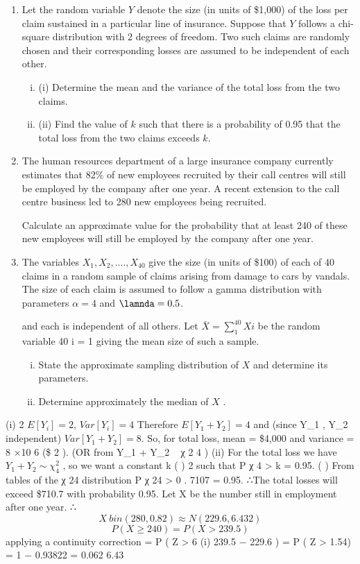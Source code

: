 \documentclass[a4paper,12pt]{article}
\begin{document}
\begin{enumerate}
\item 
Let the random variable $Y$ denote the size (in units of \$1,000) of the loss per claim sustained in a particular line of insurance. Suppose that $Y$ follows a chi-square distribution with 2 degrees of freedom. Two such claims are randomly chosen and
their corresponding losses are assumed to be independent of each other.
\begin{enumerate}[(i)]
\item (i) Determine the mean and the variance of the total loss from the two claims. 
\item (ii) Find the value of $k$ such that there is a probability of 0.95 that the total loss from the two claims exceeds $k$.
\end{enumerate}
\item 
The human resources department of a large insurance company currently estimates that 82\% of new employees recruited by their call centres will still be employed by the company after one year. A recent extension to the call centre business led to 280
new employees being recruited.

Calculate an approximate value for the probability that at least 240 of these new employees will still be employed by the company after one year.
\item The variables $X_1 , X_2 , .\ldots, X_{40}$ give the size (in units of \$100) of each of 40 claims in a random sample of claims arising from damage to cars by vandals. The size of each claim is assumed to follow a gamma distribution with parameters $\alpha = 4$ and $\lamnda = 0.5$.

and each is independent of all others. Let $\bar{X} =
\sum^{40}_{1} X i$ be the random variable
40 i = 1
giving the mean size of such a sample.
\begin{enumerate}[(i)]
\item 
State the approximate sampling distribution of $X$ and determine its parameters.
\item 
Determine approximately the median of $X$ .
\end{enumerate}
\end{enumerate}
(i)
2
$E [ Y_i ] = 2$, $Var [ Y_i ] = 4$
Therefore $E [ Y_1 + Y_2 ] = 4$ and (since Y_1 , Y_2 independent) $Var [ Y_1 + Y_2 ] = 8$.
So, for total loss, mean = \$4,000 and variance = 8 ×10 6 (\$ 2 ).
(OR from Y_1 + Y_2 ~ χ 2 4 )
(ii)
For the total loss we have $Y_1 + Y_2 \sim \chi^2_4$ , so we want a constant k
(
)
2
such that P χ 4 > k = 0.95.
(
)
From tables of the χ 24 distribution P χ 24 > 0 . 7107 = 0.95.
∴The total losses will exceed \$710.7 with probability 0.95.
Let X be the number still in employment after one year.
∴ \[X ~ bin (280, 0.82) ≈ N (229.6, 6.43 2 )\]
\[P ( X \geq 240) = P ( X > 239.5)\] applying a continuity correction
= P ( Z >
6
(i)
239.5 − 229.6
) = P ( Z > 1.54) = 1 − 0.93822 = 0.062
6.43
\end{document}
